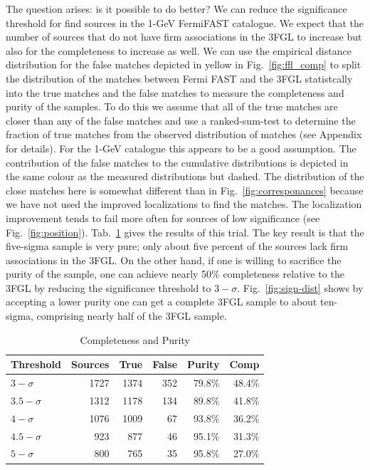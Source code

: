 \documentclass[useAMS,usenatbib]{mn2e}
\begin{document}
The question arises: is it possible to do better? We can reduce the
significance threshold for find sources in the 1-GeV FermiFAST
catalogue.  We expect that the number of sources that do not have firm
associations in the 3FGL to increase but also for the completeness to
increase as well.  We can use the empirical distance distribution for
the false matches depicted in yellow in Fig.~\ref{fig:ffl_comp} to
split the distribution of the matches between Fermi FAST and the 3FGL
statistcally into the true matches and the false matches to measure
the completeness and purity of the samples.  To do this we assume that
all of the true matches are closer than any of the false matches and
use a ranked-sum-test to determine the fraction of true matches
from the observed distribution of matches (see Appendix for details).  For
the 1-GeV catalogue this appears to be a good assumption.  The
contribution of the false matches to the cumulative distributions is
depicted in the same colour as the measured distributions but dashed.
The distribution of the close matches here is somewhat different than
in Fig.~\ref{fig:corresponances} because we have not used the improved
localizations to find the matches.  The localization improvement tends
to fail more often for sources of low significance (see
Fig.~\ref{fig:position}).  Tab.~\ref{tab:comppure} gives the results
of this trial.  The key result is that the five-sigma sample is very
pure; only about five percent of the sources lack firm associations in
the 3FGL.  On the other hand, if one is willing to sacrifice the
purity of the sample, one can achieve nearly 50\% completeness
relative to the 3FGL by reducing the significance threshold to
$3-\sigma$.  Fig.~\ref{fig:sign-dist} shows by accepting a lower
purity one can get a complete 3FGL sample to about ten-sigma,
comprising nearly half of the 3FGL sample.
\begin{table}
  \caption{Completeness and Purity}
  \label{tab:comppure}
  \begin{tabular}{l|rrrrr}
    \hline
    Threshold & \multicolumn{1}{c}{Sources} & \multicolumn{1}{c}{True} & \multicolumn{1}{c}{False} & \multicolumn{1}{c}{Purity} & \multicolumn{1}{c}{Comp} \\
    \hline
    $3-\sigma$   & 1727 & 1374 & 352 & 79.8\% & 48.4\% \\
    $3.5-\sigma$ & 1312 & 1178 & 134 & 89.8\% & 41.8\% \\
    $4-\sigma$   & 1076 & 1009 &  67 & 93.8\% & 36.2\% \\
    $4.5-\sigma$ &  923 &  877 &  46 & 95.1\% & 31.3\% \\
    $5-\sigma$   &  800 &  765 &  35 & 95.8\% & 27.0\%  
  \end{tabular}
\end{table}
\end{document}

